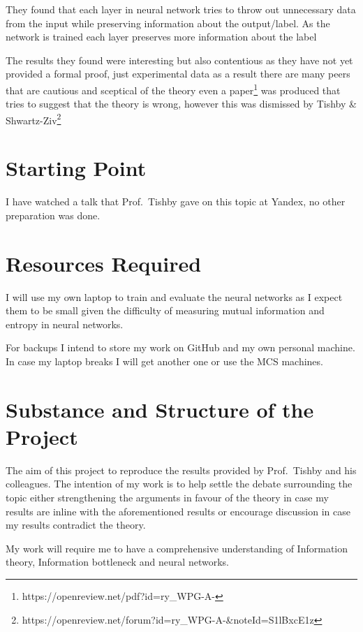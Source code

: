 \documentclass[12pt]{article}
\begin{document}
They found that each layer in neural network tries to throw out unnecessary data
from the input while preserving information about the output/label. As the
network is trained each layer preserves more information about the label

The results they found were interesting but also contentious as they have not
yet provided a formal proof, just experimental data as a result there are many
peers that are cautious and sceptical of the theory even a
paper\footnote{https://openreview.net/pdf?id=ry\_WPG-A-} was produced that tries
to suggest that the theory is wrong, however this was dismissed by Tishby \&
Shwartz-Ziv\footnote{https://openreview.net/forum?id=ry\_WPG-A-\&noteId=S1lBxcE1z}


\section*{Starting Point}

I have watched a talk that Prof.\ Tishby gave on this topic at Yandex, no other
preparation was done. 

\section*{Resources Required}

I will use my own laptop to train and evaluate the neural networks as I expect
them to be small given the difficulty of measuring mutual information and
entropy in neural networks.

For backups I intend to store my work on GitHub and my own personal machine. In
case my laptop breaks I will get another one or use the MCS machines.

\section*{Substance and Structure of the Project}

The aim of this project to reproduce the results provided by Prof.\ Tishby and
his colleagues. The intention of my work is to help settle the debate surrounding the
topic either strengthening the arguments in favour of the theory in case my
results are inline with the aforementioned results or encourage discussion in
case my results contradict the theory.

My work will require me to have a comprehensive understanding of Information
theory, Information bottleneck and neural networks.
\end{document}
